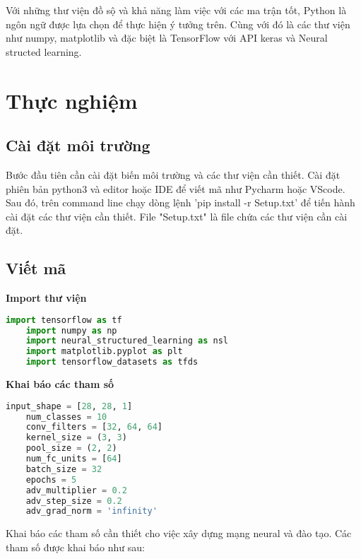 Với những thư viện đồ sộ và khả năng làm việc với các ma trận tốt, Python là ngôn ngữ được lựa chọn để thực hiện ý tưởng trên. Cùng với đó là các thư viện như numpy, matplotlib và
đặc biệt là TensorFlow với API keras và Neural structed learning.






\section{Thực nghiệm}

\subsection{Cài đặt môi trường}

Bước đầu tiên cần cài đặt biến môi trường và các thư viện cần thiết. Cài đặt phiên bản python3 và editor hoặc IDE để viết mã như Pycharm hoặc VScode.
Sau đó, trên command line chạy dòng lệnh 'pip install -r Setup.txt' để tiến hành cài đặt các thư viện cần thiết. File "Setup.txt" là file chứa các thư viện 
cần cài đặt.

\subsection{Viết mã}
\textbf{Import thư viện}
\begin{lstlisting}[language=Python]
    import tensorflow as tf
    import numpy as np
    import neural_structured_learning as nsl
    import matplotlib.pyplot as plt
    import tensorflow_datasets as tfds
\end{lstlisting}

\textbf{Khai báo các tham số}
\begin{lstlisting}[language=Python]
    input_shape = [28, 28, 1]
    num_classes = 10
    conv_filters = [32, 64, 64]
    kernel_size = (3, 3)
    pool_size = (2, 2)
    num_fc_units = [64]
    batch_size = 32
    epochs = 5
    adv_multiplier = 0.2
    adv_step_size = 0.2
    adv_grad_norm = 'infinity'
\end{lstlisting}

Khai báo các tham số cần thiết cho việc xây dựng mạng neural và đào tạo. Các tham số được khai báo như sau:

